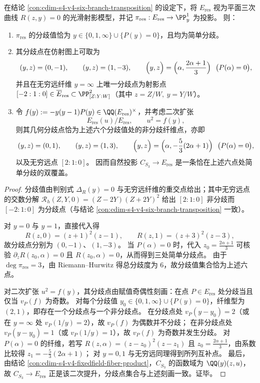 \begin{proposition}[三次预解式的分歧点与二次判别式提升的互补分歧]\label{prop:cdim-resolvent-cubic-branchpoints-and-complementary-ramification}
在结论 \ref{con:cdim-s4-v4-six-branch-transposition} 的设定下，将 \(E_{\mathrm{res}}\) 视为平面三次曲线 \(R(z,y)=0\) 的光滑射影模型，并记 \(\pi_{\mathrm{res}}:E_{\mathrm{res}}\to\PP^1_y\) 为投影。
则：
\begin{enumerate}
  \item \(\pi_{\mathrm{res}}\) 的分歧值恰为
  \(
  y\in\{0,1,\infty\}\cup\{P(y)=0\}
  \)，且均为简单分歧。
  \item 其分歧点在仿射图上可取为
  \[
  (y,z)=(0,-1),\qquad (y,z)=(1,-3),\qquad
  \Bigl(y,z\Bigr)=\Bigl(\alpha,\frac{2\alpha+1}{3}\Bigr)\ \ \bigl(P(\alpha)=0\bigr),
  \]
  并且在无穷远纤维 \(y=\infty\) 上唯一分歧点为射影点 \([-2:1:0]\in \overline{E}_{\mathrm{res}}\subset\PP^2_{[Z:Y:W]}\)（其中 \(z=Z/W,\ y=Y/W\)）。
  \item 令 \(f(y):=-y(y-1)P(y)\in\QQ(E_{\mathrm{res}})^\times\)，并考虑二次扩张
  \[
  E_{\mathrm{res}}(u)/E_{\mathrm{res}},\qquad u^2=f(y),
  \]
  则其几何分歧点恰为上述六个分歧值处的非分歧纤维点，亦即
  \[
  (y,z)=(0,1),\qquad (y,z)=(1,3),\qquad
  \Bigl(y,z\Bigr)=\Bigl(\alpha,-\frac53(2\alpha+1)\Bigr)\ \ \bigl(P(\alpha)=0\bigr),
  \]
  以及无穷远点 \([2:1:0]\)。
  因而自然投影 \(C_{S_3}\to E_{\mathrm{res}}\) 是一条恰在上述六点处简单分歧的双覆盖。
\end{enumerate}
\end{proposition}
\begin{proof}
分歧值由判别式 \(\Delta_R(y)=0\) 与无穷远纤维的重交点给出；其中无穷远点的交数分解
\(
\mathscr R_h(Z,Y,0)=(Z-2Y)(Z+2Y)^2
\)
给出 \([2:1:0]\) 非分歧而 \([-2:1:0]\) 为分歧点（与结论 \ref{con:cdim-s4-v4-six-branch-transposition} 一致）。
\par
对 \(y=0\) 与 \(y=1\)，直接代入得
\[
R(z,0)=(z+1)^2(z-1),\qquad R(z,1)=(z+3)^2(z-3),
\]
故分歧点分别为 \((0,-1)\)、\((1,-3)\)。
当 \(P(\alpha)=0\) 时，代入 \(z_0=\frac{2\alpha+1}{3}\) 可核验 \(\partial_zR(z_0,\alpha)=0\) 且 \(R(z_0,\alpha)=0\)，从而得到三处简单分歧点。
由于 \(\deg\pi_{\mathrm{res}}=3\)，由 Riemann--Hurwitz 得总分歧度为 \(6\)，故分歧值集合恰为上述六点。
\par
对二次扩张 \(u^2=f(y)\)，其分歧点由赋值奇偶性刻画：在点 \(P\in E_{\mathrm{res}}\) 处分歧当且仅当 \(v_P(f)\) 为奇数。
对每个分歧值 \(y_0\in\{0,1,\infty\}\cup\{P(y)=0\}\)，纤维型为 \((2,1)\)，即存在一个分歧点与一个非分歧点。
在分歧点处 \(v_P(y-y_0)=2\)（或在 \(y=\infty\) 处 \(v_P(1/y)=2\)），故 \(v_P(f)\) 为偶数并不分歧；
在非分歧点处 \(v_P(y-y_0)=1\)（或 \(v_P(1/y)=1\)），故 \(v_P(f)\) 为奇数并发生分歧。
对 \(P(\alpha)=0\) 的纤维，若写
\(
R(z,\alpha)=(z-z_0)^2(z-z_1)
\)
且 \(z_0=\frac{2\alpha+1}{3}\)，由系数比较得
\(
z_1=-\frac53(2\alpha+1)
\)；
对 \(y=0,1\) 与无穷远同理得到所列互补点。
最后，由结论 \ref{con:cdim-s4-v4-fixedfield-fiber-product}，\(C_{S_3}\) 的函数域为 \(\QQ(y)(z,u)\)，故 \(C_{S_3}\to E_{\mathrm{res}}\) 正是该二次提升，分歧点集合与上述刻画一致。证毕。
\end{proof}

